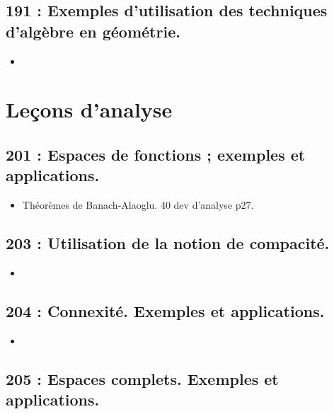 \documentclass[a4paper,10pt,oneside,twocolumn,landscape]{book}
\begin{document}
\section{191 : Exemples d’utilisation des techniques d’algèbre en géométrie.}

\begin{itemize}
	\item 
\end{itemize}





\onecolumn

\chapter{Leçons d'analyse}

\twocolumn



\section{201 : Espaces de fonctions ; exemples et applications.}

\begin{itemize} 
	\item Théorèmes de Banach-Alaoglu. 40 dev d'analyse p27.
\end{itemize}

\section{203 : Utilisation de la notion de compacité.}

\begin{itemize}
	\item 
\end{itemize}

\section{204 : Connexité. Exemples et applications.}

\begin{itemize}
	\item 
\end{itemize}

\section{205 : Espaces complets. Exemples et applications.}
\end{document}
